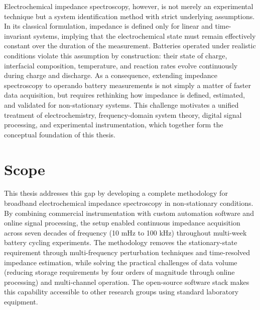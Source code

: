 Electrochemical impedance spectroscopy, however, is not merely an experimental technique but a system identification method with strict underlying assumptions. In its classical formulation, impedance is defined only for linear and time-invariant systems, implying that the electrochemical state must remain effectively constant over the duration of the measurement. Batteries operated under realistic conditions violate this assumption by construction: their state of charge, interfacial composition, temperature, and reaction rates evolve continuously during charge and discharge. As a consequence, extending impedance spectroscopy to operando battery measurements is not simply a matter of faster data acquisition, but requires rethinking how impedance is defined, estimated, and validated for non-stationary systems. This challenge motivates a unified treatment of electrochemistry, frequency-domain system theory, digital signal processing, and experimental instrumentation, which together form the conceptual foundation of this thesis.

\section{Scope}

This thesis addresses this gap by developing a complete methodology for broadband electrochemical impedance spectroscopy in non-stationary conditions. By combining commercial instrumentation with custom automation software and online signal processing, the setup enabled continuous impedance acquisition across seven decades of frequency (10 mHz to 100 kHz) throughout multi-week battery cycling experiments. The methodology removes the stationary-state requirement through multi-frequency perturbation techniques and time-resolved impedance estimation, while solving the practical challenges of data volume (reducing storage requirements by four orders of magnitude through online processing) and multi-channel operation. The open-source software stack makes this capability accessible to other research groups using standard laboratory equipment.

